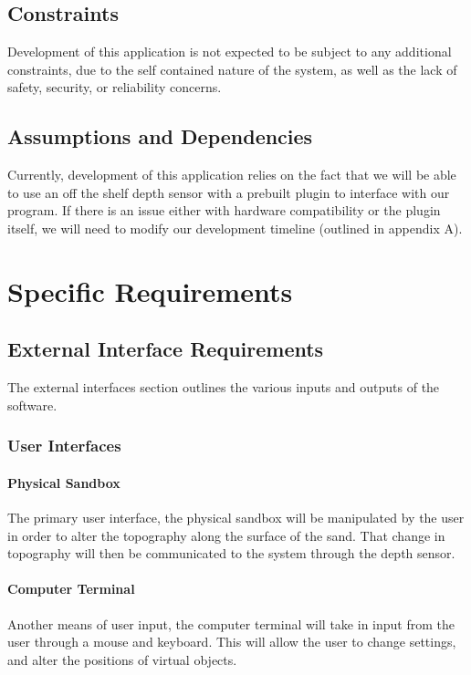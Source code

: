 \documentclass[onecolumn, draftclsnofoot,10pt, compsoc]{IEEEtran}
\begin{document}
\subsection{Constraints}
Development of this application is not expected to be subject to any additional constraints, due to the self contained nature of the system, as well as the lack of safety, security, or reliability concerns.

\subsection{Assumptions and Dependencies}
Currently, development of this application relies on the fact that we will be able to use an off the shelf depth sensor with a prebuilt plugin to interface with our program. 
If there is an issue either with hardware compatibility or the plugin itself, we will need to modify our development timeline (outlined in appendix A).


\section{Specific Requirements}
\subsection{External Interface Requirements}

The external interfaces section outlines the various inputs and outputs of the software.

\subsubsection{User Interfaces}

\paragraph{Physical Sandbox}
The primary user interface, the physical sandbox will be manipulated by the user in order to alter the topography along the surface of the sand.  That change in topography will then be communicated to the system through the depth sensor.

\paragraph{Computer Terminal}
Another means of user input, the computer terminal will take in input from the user through a mouse and keyboard.  This will allow the user to change settings, and alter the positions of virtual objects.
\end{document}
